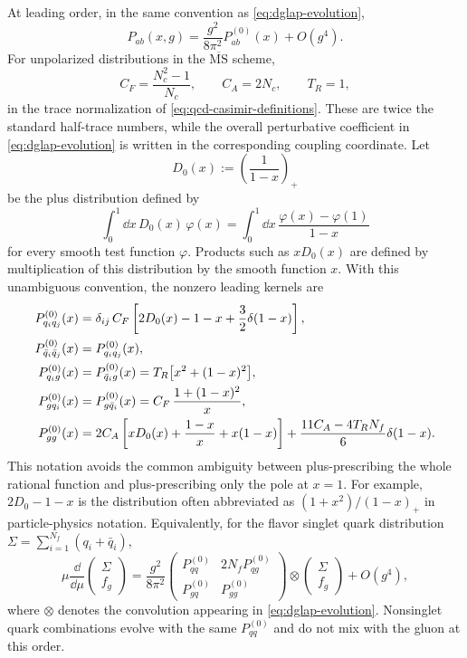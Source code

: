 At leading order, in the same convention as \eqref{eq:dglap-evolution},
\[
  P_{ab}(x,g)
  =
  \frac{g^2}{8\pi^2}P_{ab}^{(0)}(x)+O(g^4).
\]
For unpolarized distributions in the \(\overline{\mathrm{MS}}\) scheme,
\[
  C_F=\frac{N_c^2-1}{N_c},
  \qquad
  C_A=2N_c,
  \qquad
  T_R=1,
\]
in the trace normalization of \eqref{eq:qcd-casimir-definitions}.  These are
twice the standard half-trace numbers, while the overall perturbative
coefficient in \eqref{eq:dglap-evolution} is written in the corresponding
coupling coordinate.  Let
\begin{equation}
  D_0(x):=\left(\frac1{1-x}\right)_+
  \label{eq:qcd-d0-plus-distribution}
\end{equation}
be the plus distribution defined by
\[
  \int_0^1\dd x\,D_0(x)\,\varphi(x)
  =
  \int_0^1\dd x\,\frac{\varphi(x)-\varphi(1)}{1-x}
\]
for every smooth test function \(\varphi\).  Products such as \(xD_0(x)\) are
defined by multiplication of this distribution by the smooth function \(x\).
With this unambiguous convention, the nonzero leading kernels are
\begin{align}
  P_{q_iq_j}^{(0)}(x)
  &=
  \delta_{ij}\,
  C_F\left[
    2D_0(x)-1-x
    +\frac32\delta(1-x)
  \right],
  \notag\\
  P_{\bar q_i\bar q_j}^{(0)}(x)
  &=
  P_{q_iq_j}^{(0)}(x),
  \notag\\
  P_{q_i g}^{(0)}(x)
  &=
  P_{\bar q_i g}^{(0)}(x)
  =
  T_R\bigl[x^2+(1-x)^2\bigr],
  \notag\\
  P_{gq_i}^{(0)}(x)
  &=
  P_{g\bar q_i}^{(0)}(x)
  =
  C_F\,\frac{1+(1-x)^2}{x},
  \notag\\
  P_{gg}^{(0)}(x)
  &=
  2C_A\left[
    xD_0(x)
    +\frac{1-x}{x}
    +x(1-x)
  \right]
  +
  \frac{11C_A-4T_RN_f}{6}\delta(1-x).
  \label{eq:lo-dglap-splitting-kernels}
\end{align}
This notation avoids the common ambiguity between plus-prescribing the whole
rational function and plus-prescribing only the pole at \(x=1\).  For example,
\(2D_0-1-x\) is the distribution often abbreviated as
\((1+x^2)/(1-x)_+\) in particle-physics notation.  Equivalently, for the flavor
singlet quark distribution
\(\Sigma=\sum_{i=1}^{N_f}(q_i+\bar q_i)\),
\[
  \mu\frac{\dd}{\dd\mu}
  \begin{pmatrix}\Sigma\\ f_g\end{pmatrix}
  =
  \frac{g^2}{8\pi^2}
  \begin{pmatrix}
    P_{qq}^{(0)} & 2N_fP_{qg}^{(0)}\\
    P_{gq}^{(0)} & P_{gg}^{(0)}
  \end{pmatrix}
  \otimes
  \begin{pmatrix}\Sigma\\ f_g\end{pmatrix}
  +O(g^4),
\]
where \(\otimes\) denotes the convolution appearing in
\eqref{eq:dglap-evolution}.  Nonsinglet quark combinations evolve with the
same \(P_{qq}^{(0)}\) and do not mix with the gluon at this order.

